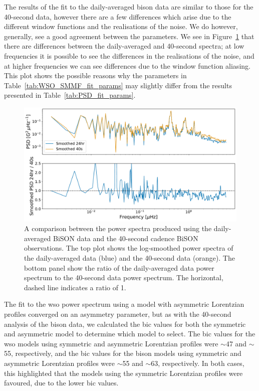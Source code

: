 The results of the fit to the daily-averaged \gls{bison} data are similar to those for the 40-second data, however there are a few differences which arise due to the different window functions and the realisations of the noise. We do however, generally, see a good agreement between the parameters. We see in Figure~\ref{fig:BiSON_PSD_40_vs_24} that there are differences between the daily-averaged and 40-second spectra; at low frequencies it is possible to see the differences in the realisations of the noise, and at higher frequencies we can see differences due to the window function aliasing. This plot shows the possible reasons why the parameters in Table~\ref{tab:WSO_SMMF_fit_params} may slightly differ from the results presented in Table~\ref{tab:PSD_fit_params}.

\begin{figure}[ht!]
	\centering
	\includegraphics[width=\columnwidth]{BiSON_24h_vs_40s.pdf}
	\caption{A comparison between the power spectra produced using the daily-averaged BiSON data and the 40-second cadence BiSON observations. The top plot shows the log-smoothed power spectra of the daily-averaged data (blue) and the 40-second data (orange). The bottom panel show the ratio of the daily-averaged data power spectrum to the 40-second data power spectrum. The horizontal, dashed line indicates a ratio of 1.}
	\label{fig:BiSON_PSD_40_vs_24}
\end{figure}


The fit to the \gls{wso} power spectrum using a model with asymmetric Lorentzian profiles converged on an asymmetry parameter, but as with the 40-second analysis of the \gls{bison} data, we calculated the \gls{bic} values for both the symmetric and asymmetric model to determine which model to select. The \gls{bic} values for the \gls{wso} models using symmetric and asymmetric Lorentzian profiles were $\sim$47 and $\sim$55, respectively, and the \gls{bic} values for the \gls{bison} models using symmetric and asymmetric Lorentzian profiles were $\sim$55 and $\sim$63, respectively. In both cases, this highlighted that the models using the symmetric Lorentzian profiles were favoured, due to the lower \gls{bic} values. 

